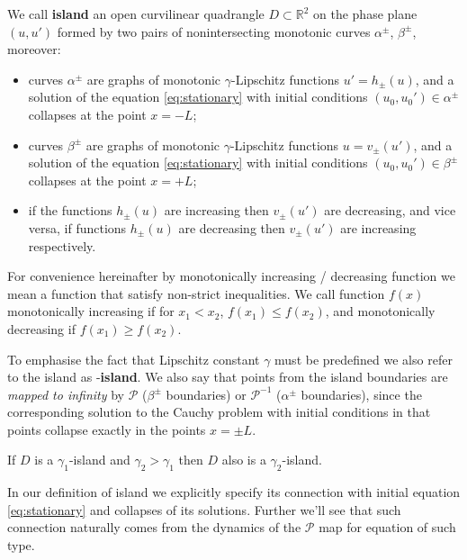 \begin{definition}
	We call {\bf island} an open curvilinear quadrangle $D \subset \mathbb{R}^2$ on the phase plane $(u, u')$ formed by two pairs of nonintersecting monotonic curves $\alpha^{\pm}$, $\beta^{\pm}$, moreover:
	\begin{itemize}
		\item curves $\alpha^{\pm}$ are graphs of monotonic $\gamma$-Lipschitz functions $u' = h_{\pm}(u)$, and a solution of the equation \eqref{eq:stationary} with initial conditions $(u_0, u_0') \in \alpha^{\pm}$ collapses at the point $x = -L$;
		\item curves $\beta^{\pm}$ are graphs of monotonic $\gamma$-Lipschitz functions $u = v_{\pm}(u')$, and a solution of the equation \eqref{eq:stationary} with initial conditions $(u_0, u_0') \in \beta^{\pm}$ collapses at the point $x = +L$;
		\item if the functions $h_{\pm}(u)$ are increasing then $v_{\pm}(u')$ are decreasing, and vice versa, if functions $h_{\pm}(u)$ are decreasing then $v_{\pm}(u')$ are increasing respectively.
	\end{itemize}	
\end{definition}

\begin{remark}
	For convenience hereinafter by monotonically increasing / decreasing function we mean a function that satisfy non-strict inequalities.
	We call function $f(x)$ monotonically increasing if for $x_1 < x_2$, $f(x_1) \le f(x_2)$, and monotonically decreasing if $f(x_1) \ge f(x_2)$.
\end{remark}

To emphasise the fact that Lipschitz constant $\gamma$ must be predefined we also refer to the island as \bm{$\gamma$}-{\bf island}.
We also say that points from the island boundaries are {\it mapped to infinity} by $\mathcal{P}$ ($\beta^{\pm}$ boundaries) or $\mathcal{P}^{-1}$ ($\alpha^{\pm}$ boundaries), since the corresponding solution to the Cauchy problem with initial conditions in that points collapse exactly in the points $x = \pm L$.

\begin{remark}
	If $D$ is a $\gamma_1$-island and $\gamma_2 > \gamma_1$	then $D$ also is a $\gamma_2$-island.
\end{remark}

In our definition of island we explicitly specify its connection with initial equation \eqref{eq:stationary} and collapses of its solutions.
Further we'll see that such connection naturally comes from the dynamics of the $\mathcal{P}$ map for equation of such type.

